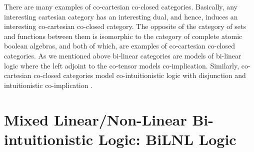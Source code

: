 \documentclass{lmcs}
\begin{document}
There are many examples of co-cartesian co-closed categories.
Basically, any interesting cartesian category has an interesting dual,
and hence, induces an interesting co-cartesian co-closed category.
The opposite of the category of sets and functions between them is
isomorphic to the category of complete atomic boolean algebras, and
both of which, are examples of co-cartesian co-closed categories.  As
we mentioned above bi-linear categories \cite{Cockett:1997a} are
models of bi-linear logic where the left adjoint to the co-tensor
models co-implication.  Similarly, co-cartesian co-closed categories
model co-intuitionistic logic with disjunction and intuitionistic
co-implication \cite{Crolard:2001,Bellin:2012}.

\section{Mixed Linear/Non-Linear Bi-intuitionistic Logic: BiLNL Logic}
\label{sec:bilnl_logic}
\end{document}

